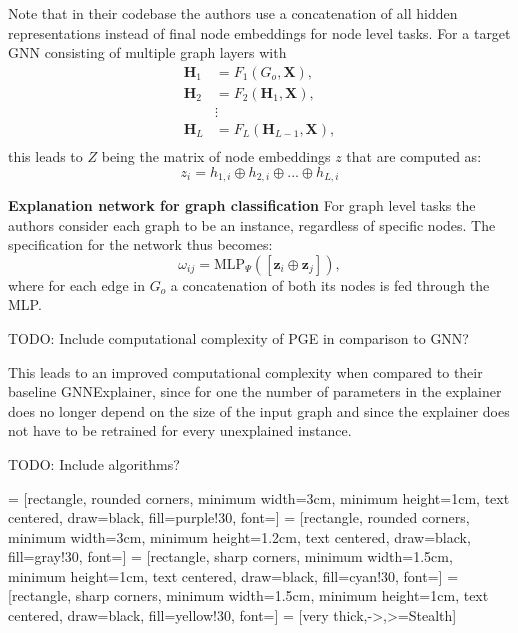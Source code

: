 Note that in their codebase the authors use a concatenation of all hidden representations instead of final node embeddings for node level tasks.
For a target GNN consisting of multiple graph layers with
\begin{align*}
    \mathbf{H}_1 &= F_1(G_o, \mathbf{X}), \\
    \mathbf{H}_2 &= F_2(\mathbf{H}_1, \mathbf{X}), \\
    &\vdots \\
    \mathbf{H}_L &= F_L(\mathbf{H}_{L-1}, \mathbf{X}), \\
\end{align*}
this leads to $Z$ being the matrix of node embeddings $z$ that are computed as:
\begin{equation}
    z_i = h_{1,i} \oplus h_{2,i} \oplus ... \oplus h_{L,i}
\end{equation}

\textbf{Explanation network for graph classification}
For graph level tasks the authors consider each graph to be an instance, regardless of specific nodes. The specification for the network thus becomes:
\begin{equation}
    \omega_{ij} = \text{MLP}_\Psi ([\mathbf{z}_i\oplus\mathbf{z}_j]),
\end{equation}
where for each edge in $G_o$ a concatenation of both its nodes is fed through the MLP.\bigskip

TODO: Include computational complexity of PGE in comparison to GNN?

This leads to an improved computational complexity when compared to their baseline GNNExplainer, since for one the number of parameters in the explainer does no longer depend on the size of the input graph and since the explainer does not have to be retrained for every unexplained instance.

TODO: Include algorithms?

 = [rectangle, rounded corners, minimum width=3cm, minimum height=1cm, text centered, draw=black, fill=purple!30, font=\small]
 = [rectangle, rounded corners, minimum width=3cm, minimum height=1.2cm, text centered, draw=black, fill=gray!30, font=\small]
 = [rectangle, sharp corners, minimum width=1.5cm, minimum height=1cm, text centered, draw=black, fill=cyan!30, font=\small]
 = [rectangle, sharp corners, minimum width=1.5cm, minimum height=1cm, text centered, draw=black, fill=yellow!30, font=\small]
 = [very thick,->,>=Stealth]    %

